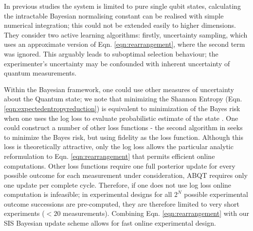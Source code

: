 In previous studies \cite{SelfLearning} the system is limited to pure single qubit states, calculating the intractable Bayesian normalising constant can be realised with simple numerical integration; this could not be extended easily to higher dimensions. They consider two active learning algorithms: firstly, uncertainty sampling, which uses an approximate version of Eqn. \eqref{eqn:rearrangement}, where the second term was ignored. This arguably leads to suboptimal selection behaviour; the experimenter's uncertainty may be confounded with inherent uncertainty of quantum measurements. 

Within the Bayesian framework, one could use other measures of uncertainty about the Quantum state; we note that minimizing the Shannon Entropy (Eqn. \eqref{eqn:expectedentropyreduction}) is equivalent to minimization of the Bayes risk when one uses the log loss to evaluate probabilistic estimate of the state \cite{Dawid2007}. One could construct a number of other loss functions - the second algorithm in \cite{SelfLearning} seeks to minimize the Bayes risk, but using fidelity as the loss function. Although this loss is theoretically attractive, only the log loss allows the particular analytic reformulation to Eqn. \eqref{eqn:rearrangement} that permits efficient online computations. Other loss functions require one full posterior update for every possible outcome for each measurement under consideration, ABQT requires only one update per complete cycle. Therefore, if one does not use log loss online computation is infeasible; in \cite{SelfLearningExperimental} experimental designs for all $2^N$ possible experimental outcome successions are pre-computed, they are therefore limited to very short experiments ($< 20$ measurements). Combining Eqn. \eqref{eqn:rearrangement} with our SIS Bayesian update scheme allows for fast online experimental design.


